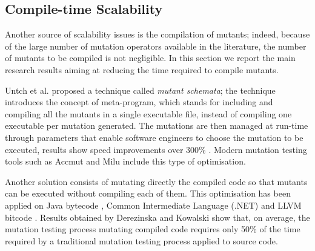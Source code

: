 
\subsection{Compile-time Scalability}
\label{sub:compileTime}
\label{sec:opt:selection}

Another source of scalability issues is the compilation of mutants;
indeed, because of the large number of mutation operators available in the literature, the number of mutants to be compiled is not negligible. In this section we report the main research results aiming at reducing the time required to compile mutants.

Untch et al. \cite{untch1993mutation} proposed a technique called \emph{mutant schemata}; the technique introduces the concept of meta-program, which stands for including and compiling all the mutants in a single executable file, instead of compiling one executable per mutation generated. The mutations are then managed at run-time through parameters that enable software engineers to choose the mutation to be executed, results show speed improvements over 300\% \cite{untch1993mutation,papadakis2010automatic}. Modern mutation testing tools such as Accmut \cite{wang2017faster} and Milu \cite{jia2008milu} include this type of optimisation.

Another solution consists of mutating directly the compiled code so that mutants can be executed without compiling each of them.
This optimisation has been applied on Java bytecode \cite{ma2006mujava}, Common Intermediate Language (.NET) \cite{derezinska2011object} and LLVM bitcode \cite{hariri2016evaluating}. Results obtained by Derezinska and Kowalski \cite{derezinska2011object} show that, on average, 
the mutation testing process mutating compiled code requires only 50\% of the time required by a traditional mutation testing process applied to source code.
